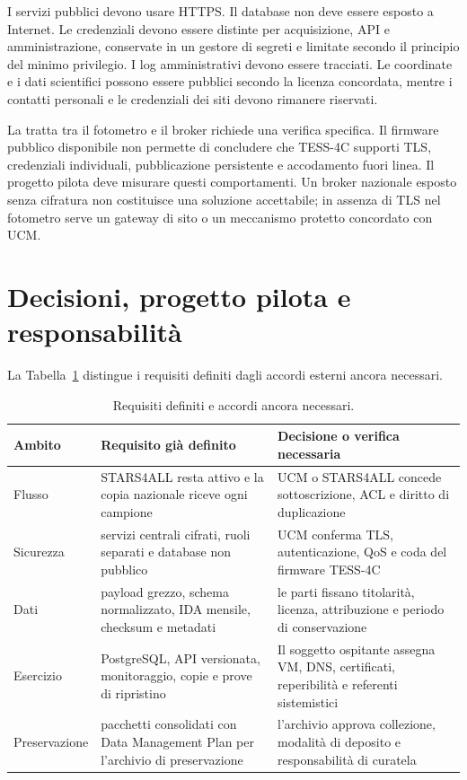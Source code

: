 \documentclass[11pt,a4paper]{report}
\begin{document}
I servizi pubblici devono usare HTTPS. Il database non deve essere esposto a Internet. Le credenziali devono essere distinte per acquisizione, API e amministrazione, conservate in un gestore di segreti e limitate secondo il principio del minimo privilegio. I log amministrativi devono essere tracciati. Le coordinate e i dati scientifici possono essere pubblici secondo la licenza concordata, mentre i contatti personali e le credenziali dei siti devono rimanere riservati.

La tratta tra il fotometro e il broker richiede una verifica specifica. Il firmware pubblico disponibile non permette di concludere che TESS-4C supporti TLS, credenziali individuali, pubblicazione persistente e accodamento fuori linea. Il progetto pilota deve misurare questi comportamenti. Un broker nazionale esposto senza cifratura non costituisce una soluzione accettabile; in assenza di TLS nel fotometro serve un gateway di sito o un meccanismo protetto concordato con UCM.


\section*{Decisioni, progetto pilota e responsabilità}
\label{sec:decisioni}

La Tabella~\ref{tab:decisioni} distingue i requisiti definiti dagli accordi esterni ancora necessari.

\begin{table}[ht!]
\centering
\renewcommand{\arraystretch}{1.5}
\footnotesize

\begin{tabularx}{\linewidth}{@{}p{2.2cm} X X@{}}
\toprule
Ambito & Requisito già definito & Decisione o verifica necessaria \\
\midrule
Flusso & STARS4ALL resta attivo e la copia nazionale riceve ogni campione & UCM o STARS4ALL concede sottoscrizione, ACL e diritto di duplicazione \\
Sicurezza & servizi centrali cifrati, ruoli separati e database non pubblico & UCM conferma TLS, autenticazione, QoS e coda del firmware TESS-4C \\
Dati & payload grezzo, schema normalizzato, IDA mensile, checksum e metadati & le parti fissano titolarità, licenza, attribuzione e periodo di conservazione \\
Esercizio & PostgreSQL, API versionata, monitoraggio, copie e prove di ripristino & Il soggetto ospitante assegna VM, DNS, certificati, reperibilità e referenti sistemistici \\
Preservazione & pacchetti consolidati con Data Management Plan per l'archivio di preservazione & l'archivio approva collezione, modalità di deposito e responsabilità di curatela \\
\bottomrule
\end{tabularx}

\caption{Requisiti definiti e accordi ancora necessari.}
\label{tab:decisioni}
\end{table}
\end{document}
